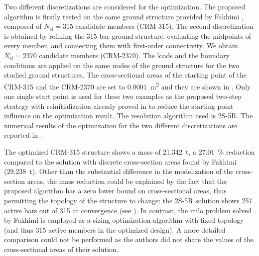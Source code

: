     Two different discretizations are considered for the optimization. The proposed algorithm is firstly tested on the same ground structure provided by Fakhimi \etal {}, composed of $N_{\text{el}}=315$ candidate members (CRM-315). The second discretization is obtained by refining the 315-bar ground structure, evaluating the midpoints of every member, and connecting them with first-order connectivity. We obtain $N_{\text{el}}=2370$ candidate members (CRM-2370). The loads and the boundary conditions are applied on the same nodes of the ground structure for the two studied ground structures. The cross-sectional areas of the starting point of the CRM-315 and the CRM-2370 are set to \qty{0.0001}{m^2} and they are shown in . Only one single start point is used for these two examples as the proposed two-step strategy with reinitialization already proved in  to reduce the starting point influence on the optimization result. The resolution algorithm used is 2S-5R. The numerical results of the optimization for the two different discretizations are reported in . 
    
    The optimized CRM-315 structure shows a mass of \qty{21.342}{\tonne}, a \qty{27.01}{\%} reduction compared to the solution with discrete cross-section areas found by Fakhimi \etal {} (\qty{29.238}{\tonne}). Other than the substantial difference in the modelization of the cross-section areas, the mass reduction could be explained by the fact that the proposed algorithm has a zero lower bound on cross-sectional areas, thus permitting the topology of the structure to change: the 2S-5R solution shows 257 active bars out of 315 at convergence (see ). In contrast, the \gls{milo} problem solved by Fakhimi \etal \cite{fakhimi_discrete_2021} is employed as a sizing optimization algorithm with fixed topology (and thus 315 active members in the optimized design). A more detailed comparison could not be performed as the authors did not share the values of the cross-sectional areas of their solution. 
    
